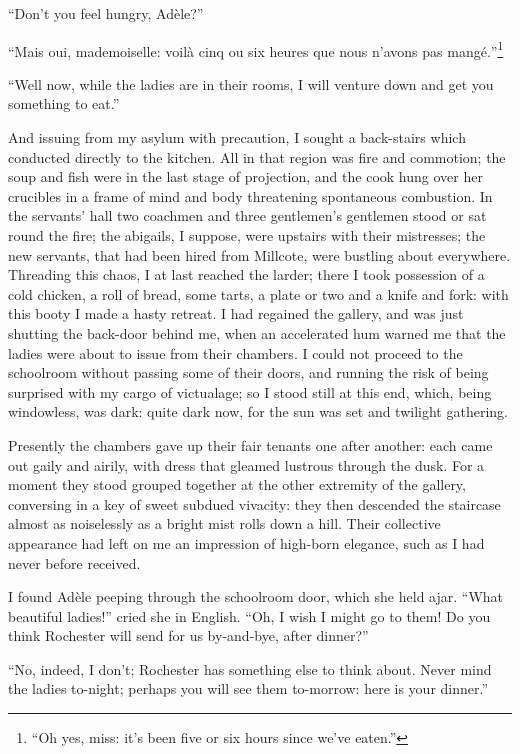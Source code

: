 \enquote{Don't you feel hungry, Adèle?}

\foreignquote{french}{Mais oui, mademoiselle: voilà cinq ou six heures que nous
n'avons pas mangé.}\footnote{\enquote{Oh yes, miss: it's been five or six hours since we've eaten.}}

\enquote{Well now, while the ladies are in their rooms, I will venture
down and get you something to eat.}

And issuing from my asylum with precaution, I sought a back-stairs which
conducted directly to the kitchen. All in that region was fire and
commotion; the soup and fish were in the last stage of projection, and
the cook hung over her crucibles in a frame of mind and body threatening
spontaneous combustion. In the servants' hall two coachmen and three
gentlemen's gentlemen stood or sat round the fire; the abigails, I
suppose, were upstairs with their mistresses; the new servants, that had
been hired from Millcote, were bustling about everywhere. Threading
this chaos, I at last reached the larder; there I took possession of a
cold chicken, a roll of bread, some tarts, a plate or two and a knife
and fork: with this booty I made a hasty retreat. I had regained the
gallery, and was just shutting the back-door behind me, when an
accelerated hum warned me that the ladies were about to issue from their
chambers. I could not proceed to the schoolroom without passing some of
their doors, and running the risk of being surprised with my cargo of
victualage; so I stood still at this end, which, being windowless, was
dark: quite dark now, for the sun was set and twilight gathering.

Presently the chambers gave up their fair tenants one after another:
each came out gaily and airily, with dress that gleamed lustrous through
the dusk. For a moment they stood grouped together at the other
extremity of the gallery, conversing in a key of sweet subdued vivacity:
they then descended the staircase almost as noiselessly as a bright mist
rolls down a hill. Their collective appearance had left on me an
impression of high-born elegance, such as I had never before received.

I found Adèle peeping through the schoolroom door, which she held ajar. 
\enquote{What beautiful ladies!} cried she in English. \enquote{Oh, I
wish I might go to them! Do you think \Mr{} Rochester will send for us
by-and-bye, after dinner?}

\enquote{No, indeed, I don't; \Mr{} Rochester has something else to think
about. Never mind the ladies to-night; perhaps you will see them
to-morrow: here is your dinner.}

